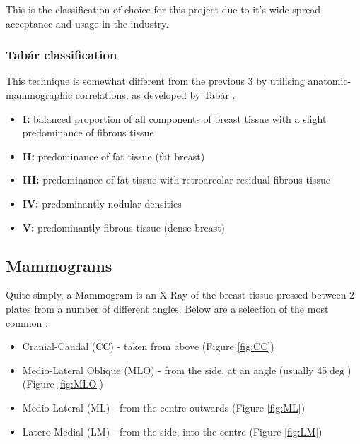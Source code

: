 This is the classification of choice for this project due to it's wide-spread acceptance and usage in the industry.

\subsubsection{Tab\'ar classification}

This technique is somewhat different from the previous 3 by utilising anatomic-mammographic correlations, as developed by Tab\'ar \cite{al}.

\begin{itemize}
  \item \textbf{I: } balanced proportion of all components of breast tissue with a slight predominance of fibrous tissue
  \item \textbf{II: } predominance of fat tissue (fat breast)
  \item \textbf{III: } predominance of fat tissue with retroareolar residual fibrous tissue
  \item \textbf{IV: } predominantly nodular densities
  \item \textbf{V: } predominantly fibrous tissue (dense breast)
\end{itemize}

\subsection{Mammograms}

Quite simply, a Mammogram is an X-Ray of the breast tissue pressed between 2 plates from a number of different angles. Below are a selection of the most common \cite{Radswiki} \cite{Mammography_views_Doc_2016}:
\begin{itemize}
  \item Cranial-Caudal (CC) - taken from above (Figure \ref{fig:CC})
  \item Medio-Lateral Oblique (MLO) - from the side, at an angle (usually 45$\deg$) (Figure \ref{fig:MLO})
  \item Medio-Lateral (ML) - from the centre outwards (Figure \ref{fig:ML})
  \item Latero-Medial (LM) - from the side, into the centre (Figure \ref{fig:LM})
\end{itemize}

